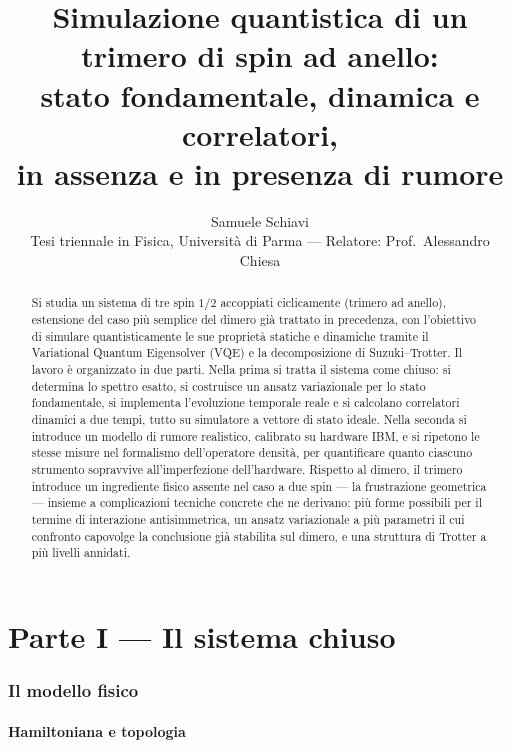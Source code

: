 \documentclass[11pt,a4paper]{article}
\title{\bfseries Simulazione quantistica di un trimero di spin ad anello:\\
stato fondamentale, dinamica e correlatori,\\
in assenza e in presenza di rumore}
\author{Samuele Schiavi \\ \small Tesi triennale in Fisica, Università di Parma
--- Relatore: Prof.\ Alessandro Chiesa}
\date{}
\begin{document}
\maketitle
\thispagestyle{fancy}

\begin{abstract}
\noindent
Si studia un sistema di tre spin $1/2$ accoppiati ciclicamente (trimero ad
anello), estensione del caso più semplice del dimero già trattato in
precedenza, con l'obiettivo di simulare quantisticamente le sue proprietà
statiche e dinamiche tramite il Variational Quantum Eigensolver (VQE) e la
decomposizione di Suzuki--Trotter. Il lavoro è organizzato in due parti.
Nella prima si tratta il sistema come chiuso: si determina lo spettro
esatto, si costruisce un ansatz variazionale per lo stato fondamentale, si
implementa l'evoluzione temporale reale e si calcolano correlatori
dinamici a due tempi, tutto su simulatore a vettore di stato ideale. Nella
seconda si introduce un modello di rumore realistico, calibrato su
hardware IBM, e si ripetono le stesse misure nel formalismo dell'operatore
densità, per quantificare quanto ciascuno strumento sopravvive
all'imperfezione dell'hardware. Rispetto al dimero, il trimero introduce
un ingrediente fisico assente nel caso a due spin --- la frustrazione
geometrica --- insieme a complicazioni tecniche concrete che ne derivano:
più forme possibili per il termine di interazione antisimmetrica, un
ansatz variazionale a più parametri il cui confronto capovolge la
conclusione già stabilita sul dimero, e una struttura di Trotter a più
livelli annidati.
\end{abstract}

\tableofcontents

\part*{Parte I --- Il sistema chiuso}

\section{Il modello fisico}
\label{sec:modello}

\subsection{Hamiltoniana e topologia}
\end{document}
